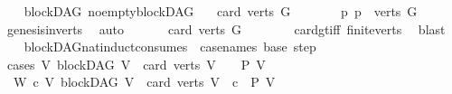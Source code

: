 \begin{isabellebody}
\isamarkupfalse%
%
\endisatagproof
{\isafoldproof}%
%
\isadelimproof
\ \isanewline
%
\endisadelimproof
\isanewline
{}\isamarkupfalse%
\ {\isacharparenleft}{\kern0pt}\ blockDAG{\isacharparenright}{\kern0pt}\ no{\isacharunderscore}{\kern0pt}empty{\isacharunderscore}{\kern0pt}blockDAG{\isacharcolon}{\kern0pt}\isanewline
\ \ \ {\isachardoublequoteopen}card\ {\isacharparenleft}{\kern0pt}verts\ G{\isacharparenright}{\kern0pt}\ {\isachargreater}{\kern0pt}\ {}{\isachardoublequoteclose}\isanewline
%
\isadelimproof
%
\endisadelimproof
%
\isatagproof
{}\isamarkupfalse%
\ {\isacharminus}{\kern0pt}\isanewline
\ \ \isamarkupfalse%
\ {\isachardoublequoteopen}{\isasymexists}p{\isachardot}{\kern0pt}\ p\ {\isasymin}\ verts\ G{\isachardoublequoteclose}\isanewline
\ \ \ \ \isamarkupfalse%
\ genesis{\isacharunderscore}{\kern0pt}in{\isacharunderscore}{\kern0pt}verts\ \isamarkupfalse%
\ auto\ \isanewline
\ \ \isamarkupfalse%
\ \isamarkupfalse%
\ {\isachardoublequoteopen}card\ {\isacharparenleft}{\kern0pt}verts\ G{\isacharparenright}{\kern0pt}\ {\isachargreater}{\kern0pt}\ {}{\isachardoublequoteclose}\isanewline
\ \ \ \ \isamarkupfalse%
\ card{\isacharunderscore}{\kern0pt}gt{\isacharunderscore}{\kern0pt}{}{\isacharunderscore}{\kern0pt}iff\ finite{\isacharunderscore}{\kern0pt}verts\ \isamarkupfalse%
\ blast\isanewline
{}\isamarkupfalse%
%
\endisatagproof
{\isafoldproof}%
%
\isadelimproof
\isanewline
%
\endisadelimproof
\isanewline
\ \ \isanewline
{}\isamarkupfalse%
\ blockDAG{\isacharunderscore}{\kern0pt}nat{\isacharunderscore}{\kern0pt}induct{\isacharbrackleft}{\kern0pt}consumes\ {}{\isacharcomma}{\kern0pt}\ case{\isacharunderscore}{\kern0pt}names\ base\ step{\isacharbrackright}{\kern0pt}{\isacharcolon}{\kern0pt}\ \isanewline
\ \ \isanewline
\ cases{\isacharcolon}{\kern0pt}\ {\isachardoublequoteopen}{\isasymAnd}V{\isachardot}{\kern0pt}\ {\isacharparenleft}{\kern0pt}blockDAG\ V\ {\isasymLongrightarrow}\ card\ {\isacharparenleft}{\kern0pt}verts\ V{\isacharparenright}{\kern0pt}\ {\isacharequal}{\kern0pt}\ {}\ {\isasymLongrightarrow}\ P\ V{\isacharparenright}{\kern0pt}{\isachardoublequoteclose}\isanewline
\ \ {\isachardoublequoteopen}{\isasymAnd}W\ c{\isachardot}{\kern0pt}\ {\isacharparenleft}{\kern0pt}{\isasymAnd}V{\isachardot}{\kern0pt}\ {\isacharparenleft}{\kern0pt}blockDAG\ V\ {\isasymLongrightarrow}\ card\ {\isacharparenleft}{\kern0pt}verts\ V{\isacharparenright}{\kern0pt}\ {\isacharequal}{\kern0pt}\ c\ {\isasymLongrightarrow}\ P\ V{\isacharparenright}{\kern0pt}{\isacharparenright}{\kern0pt}\ \isanewline

\end{isabellebody}
